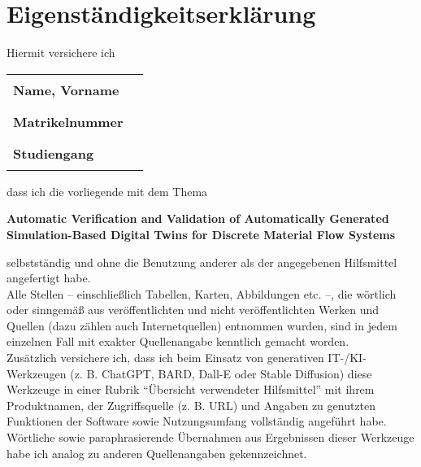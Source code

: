 \chapter*{Eigenständigkeitserklärung}
\thispagestyle{plain}

\vspace{0.5em}

Hiermit versichere ich

\vspace{0.5em}

\noindent
\begin{tabular}{ll}
  \textbf{Name, Vorname}  & \rule{8cm}{0.4pt} \\
  \textbf{Matrikelnummer} & \rule{8cm}{0.4pt} \\
  \textbf{Studiengang}    & \rule{8cm}{0.4pt}
\end{tabular}

\vspace{1em}

\noindent
dass ich die vorliegende mit dem Thema

\begin{center}
  \large\bfseries
  Automatic Verification and Validation of Automatically Generated \\
  Simulation-Based Digital Twins for Discrete Material Flow Systems
\end{center}

\vspace{0.5em}

\noindent
selbstständig und ohne die Benutzung anderer als der angegebenen Hilfsmittel angefertigt habe. \\
Alle Stellen – einschließlich Tabellen, Karten, Abbildungen etc. –, die wörtlich oder sinngemäß aus veröffentlichten und nicht veröffentlichten Werken und Quellen (dazu zählen auch Internetquellen) entnommen wurden, sind in jedem einzelnen Fall mit exakter Quellenangabe kenntlich gemacht worden. \\

\noindent
Zusätzlich versichere ich, dass ich beim Einsatz von generativen IT-/KI-Werkzeugen (z. B. ChatGPT, BARD, Dall-E oder Stable Diffusion) diese Werkzeuge in einer Rubrik \enquote{Übersicht verwendeter Hilfsmittel} mit ihrem Produktnamen, der Zugriffsquelle (z. B. URL) und Angaben zu genutzten Funktionen der Software sowie Nutzungsumfang vollständig angeführt habe. Wörtliche sowie paraphrasierende Übernahmen aus Ergebnissen dieser Werkzeuge habe ich analog zu anderen Quellenangaben gekennzeichnet. \\



